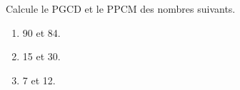 %
%
    Calcule le PGCD et le PPCM des nombres suivants.
    \begin{enumerate}[cols=3]
        \item 90 et 84.
        \item 15 et 30.
        \item 7 et 12.
    \end{enumerate}
    \vspace*{7cm}
